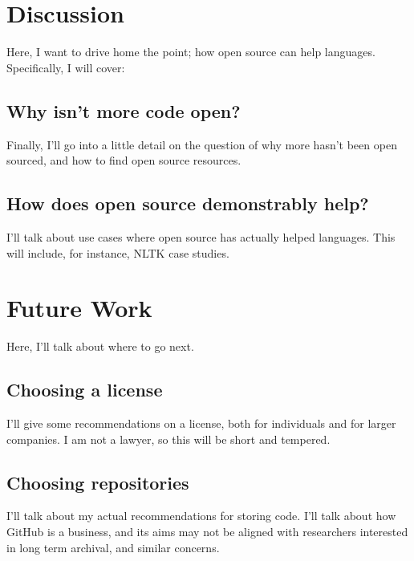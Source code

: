 \section{Discussion}

Here, I want to drive home the point; how open source can help languages. Specifically, I will cover:

\subsection{Why isn't more code open?}

Finally, I'll go into a little detail on the question of why more hasn't been open sourced, and how to find open source resources.

\subsection{How does open source demonstrably help?}

I'll talk about use cases where open source has actually helped languages. This will include, for instance, NLTK case studies.

\section{Future Work}\label{sec:future-work}

Here, I'll talk about where to go next.

\subsection{Choosing a license}

I'll give some recommendations on a license, both for individuals and for larger companies. I am not a lawyer, so this will be short and tempered.

\subsection{Choosing repositories}

I'll talk about my actual recommendations for storing code. I'll talk about how GitHub is a business, and its aims may not be aligned with researchers interested in long term archival, and similar concerns.


